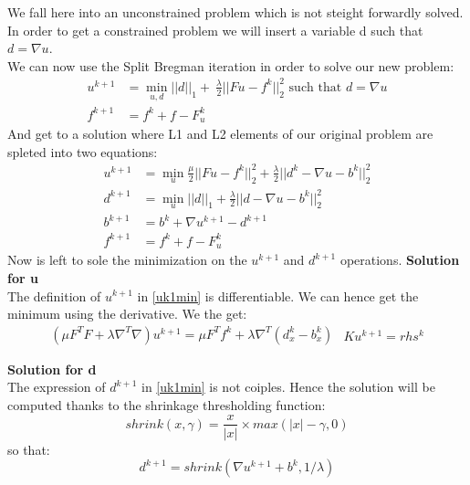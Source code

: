 	We fall here into an unconstrained problem which is not steight forwardly solved. In order to get a constrained problem we will insert a variable d such that $d = \nabla u$.\\
	We can now use the Split Bregman iteration in order to solve our new problem: 
     \begin{equation}
        \begin{aligned}
            u^{k+1} &= \min_{u,d}||d||_1 + \ \frac{\lambda}{2}||Fu - f^k||_2^2 \mbox{ such that } d = \nabla u\\
            f^{k+1} &= f^k + f - F_u^k
        \end{aligned}
    \end{equation}
	And get to a solution where L1 and L2 elements of our original problem are spleted into two equations:
    \begin{equation}
        \begin{aligned}
            u^{k+1} &= \min_{u} \frac{\mu}{2}||Fu - f^k||_2^2 + \frac{\lambda}{2} ||d^k - \nabla u - b^k||_2^2\\
            d^{k+1} &= \min_{u} ||d||_1 + \frac{\lambda}{2}||d - \nabla u-b^k||_2^2\\
            b^{k+1} &= b^k +\nabla u^{k+1} - d^{k+1}\\
            f^{k+1} &= f^k + f - F_u^k
        \end{aligned}
        \label{uk1min}
    \end{equation}
    Now is left to sole the minimization on the $u^{k+1}$ and $d^{k+1}$ operations.
    \textbf{Solution for u}\\
     The definition of $u^{k+1}$ in \ref{uk1min} is differentiable. We can hence get the minimum using the derivative. We the get:\\

\begin{equation}
	\begin{aligned}
		(\mu F^{T}F + \lambda \nabla^{T}\nabla) u^{k+1} = \mu F^{T}f^{k} + \lambda \nabla^{T}(d^{k}_x - b^{k}_x) 
	\end{aligned}
	\begin{aligned}
		K u^{k+1} = rhs^{k} 
	\end{aligned}
\end{equation}

\textbf{Solution for d}\\
    The expression of $d^{k+1}$ in \ref{uk1min} is not coiples. Hence the solution will be computed thanks to the shrinkage thresholding function:
    \begin{equation}
    	shrink(x,\gamma) = \frac{x}{|x|}\times max(|x| - \gamma, 0)
    \end{equation}
    so that:
    \begin{equation}
    	d^{k+1} =  shrink(\nabla u^{k+1} + b^k, 1/\lambda)
    \end{equation}
    
